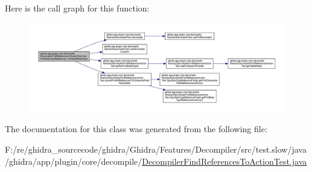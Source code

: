 Here is the call graph for this function\+:
\nopagebreak
\begin{figure}[H]
\begin{center}
\leavevmode
\includegraphics[width=350pt]{classghidra_1_1app_1_1plugin_1_1core_1_1decompile_1_1_decompiler_find_references_to_action_test_a303f1a21bc0949e92a7b9793d7a56a73_cgraph}
\end{center}
\end{figure}


The documentation for this class was generated from the following file\+:\begin{DoxyCompactItemize}
\item 
F\+:/re/ghidra\+\_\+sourcecode/ghidra/\+Ghidra/\+Features/\+Decompiler/src/test.\+slow/java/ghidra/app/plugin/core/decompile/\mbox{\hyperlink{_decompiler_find_references_to_action_test_8java}{Decompiler\+Find\+References\+To\+Action\+Test.\+java}}\end{DoxyCompactItemize}
